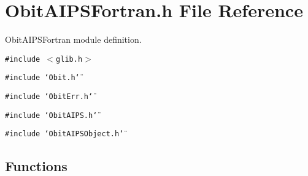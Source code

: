 \section{Obit\-AIPSFortran.h File Reference}
\label{ObitAIPSFortran_8h}
Obit\-AIPSFortran module definition. 

{\tt \#include $<$glib.h$>$}\par
{\tt \#include \char`\"{}Obit.h\char`\"{}}\par
{\tt \#include \char`\"{}Obit\-Err.h\char`\"{}}\par
{\tt \#include \char`\"{}Obit\-AIPS.h\char`\"{}}\par
{\tt \#include \char`\"{}Obit\-AIPSObject.h\char`\"{}}\par
\subsection*{Functions}
